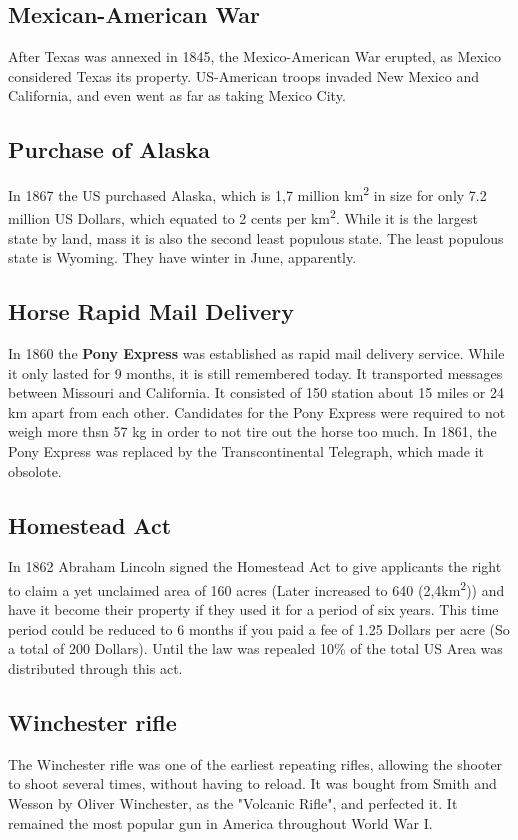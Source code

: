 \documentclass{article}
\begin{document}
	\subsection{Mexican-American War}
	After Texas was annexed in 1845, the Mexico-American War erupted, as Mexico considered Texas its property. US-American troops invaded New Mexico and California, and even went as far as taking Mexico City. \\
	\subsection{Purchase of Alaska}
	In 1867 the US purchased Alaska, which is 1,7 million km\textsuperscript{2} in size for only 7.2 million US Dollars, which equated to 2 cents per km\textsuperscript{2}. While it is the largest state by land, mass it is also the second least populous state. The least populous state is Wyoming. They have winter in June, apparently. \\
	\subsection{Horse Rapid Mail Delivery}
	In 1860 the \textbf{Pony Express} was established as rapid mail delivery service. While it only lasted for 9 months, it is still remembered today. It transported messages between Missouri and California. It consisted of 150 station about 15 miles or 24 km apart from each other. Candidates for the Pony Express were required to not weigh more thsn 57 kg in order to not tire out the horse too much. In 1861, the Pony Express was replaced by the Transcontinental Telegraph, which made it obsolote. \\
	\subsection{Homestead Act}
	In 1862 Abraham Lincoln signed the Homestead Act to give applicants the right to claim a yet unclaimed area of 160 acres (Later increased to 640 (2,4km\textsuperscript{2})) and have it become their property if they used it for a period of six years. This time period could be reduced to 6 months if you paid a fee of 1.25 Dollars per acre (So a total of 200 Dollars). Until the law was repealed 10\% of the total US Area was distributed through this act. \\
	\subsection{Winchester rifle}
	The Winchester rifle was one of the earliest repeating rifles, allowing the shooter to shoot several times, without having to reload. It was bought from Smith and Wesson by Oliver Winchester, as the "Volcanic Rifle", and perfected it. It remained the most popular gun in America throughout World War I. \\
\end{document}

